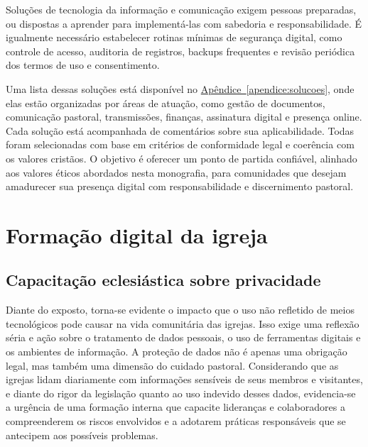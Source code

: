 Soluções de tecnologia da informação e comunicação exigem pessoas preparadas, ou dispostas a aprender para implementá-las com sabedoria e responsabilidade. É igualmente necessário estabelecer rotinas mínimas de segurança digital, como controle de acesso, auditoria de registros, backups frequentes e revisão periódica dos termos de uso e consentimento.

Uma lista dessas soluções está disponível no \hyperref[apendice:solucoes]{Apêndice~\ref*{apendice:solucoes}}, onde elas estão organizadas por áreas de atuação, como gestão de documentos, comunicação pastoral, transmissões, finanças, assinatura digital e presença online. Cada solução está acompanhada de comentários sobre sua aplicabilidade. Todas foram selecionadas com base em critérios de conformidade legal e coerência com os valores cristãos. O objetivo é oferecer um ponto de partida confiável, alinhado aos valores éticos abordados nesta monografia, para comunidades que desejam amadurecer sua presença digital com responsabilidade e discernimento pastoral.

\section{Formação digital da igreja}

\subsection{Capacitação eclesiástica sobre privacidade}

Diante do exposto, torna-se evidente o impacto que o uso não refletido de meios tecnológicos pode causar na vida comunitária das igrejas. Isso exige uma reflexão séria e ação sobre o tratamento de dados pessoais, o uso de ferramentas digitais e os ambientes de informação. A proteção de dados não é apenas uma obrigação legal, mas também uma dimensão do cuidado pastoral. Considerando que as igrejas lidam diariamente com informações sensíveis de seus membros e visitantes, e diante do rigor da legislação quanto ao uso indevido desses dados, evidencia-se a urgência de uma formação interna que capacite lideranças e colaboradores a compreenderem os riscos envolvidos e a adotarem práticas responsáveis que se antecipem aos possíveis problemas.

